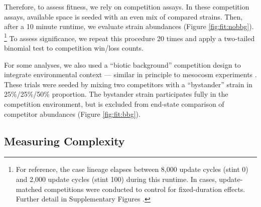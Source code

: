 Therefore, to assess fitness, we rely on competition assays.
In these competition assays, available space is seeded with an even mix of compared strains.
Then, after a 10 minute runtime, we evaluate strain abundances (Figure \ref{fig:fit:nobbg}).
\unskip\footnote{%
For reference, the case lineage elapses between 8,000 update cycles (stint 0) and 2,000 update cycles (stint 100) during this runtime.
In cases, update-matched competitions were conducted to control for fixed-duration effects.
Further detail in Supplementary Figures .
}
To assess significance, we repeat this procedure 20 times and apply a two-tailed binomial test to competition win/loss counts.

For some analyses, we also used a ``biotic background'' competition design to integrate environmental context --- similar in principle to mesocosm experiments \citep{sala2000methods}.
These trials were seeded by mixing two competitors with a ``bystander'' strain in 25\%/25\%/50\% proportion.
The bystander strain participates fully in the competition environment, but is excluded from end-state comparison of competitor abundances (Figure \ref{fig:fit:bbg}).

\subsection{Measuring Complexity}
\label{sec:measuringcomplexity}

